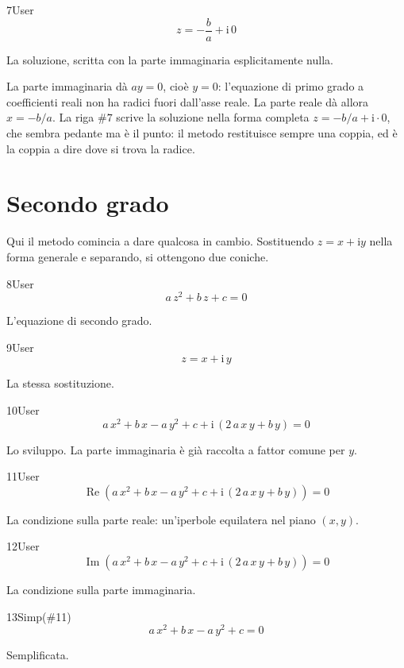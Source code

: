 \begin{espr}{7}{User}{}
\[
z = -\frac{b}{a} + \mathrm{i}\, 0
\]
\end{espr}
La soluzione, scritta con la parte immaginaria esplicitamente nulla.


La parte immaginaria dà $ay=0$, cioè $y=0$: l'equazione di primo grado a coefficienti reali non ha radici fuori dall'asse reale. La parte reale dà allora $x=-b/a$. La riga $\#7$ scrive la soluzione nella forma completa $z=-b/a+\mathrm{i}\cdot0$, che sembra pedante ma è il punto: il metodo restituisce sempre una coppia, ed è la coppia a dire dove si trova la radice.

\section{Secondo grado}

Qui il metodo comincia a dare qualcosa in cambio. Sostituendo $z=x+\mathrm{i}y$ nella forma generale e separando, si ottengono due coniche.

\begin{espr}{8}{User}{}
\[
a\, z^{2} + b\, z + c = 0
\]
\end{espr}
L'equazione di secondo grado.

\begin{espr}{9}{User}{}
\[
z = x + \mathrm{i}\, y
\]
\end{espr}
La stessa sostituzione.

\begin{espr}{10}{User}{}
\[
a\, x^{2} + b\, x - a\, y^{2} + c + \mathrm{i}\, \left(2\, a\, x\, y + b\, y\right) = 0
\]
\end{espr}
Lo sviluppo. La parte immaginaria è già raccolta a fattor comune per $y$.

\begin{espr}{11}{User}{}
\[
\operatorname{Re}\!\left(a\, x^{2} + b\, x - a\, y^{2} + c + \mathrm{i}\, \left(2\, a\, x\, y + b\, y\right)\right) = 0
\]
\end{espr}
La condizione sulla parte reale: un'iperbole equilatera nel piano $(x,y)$.

\begin{espr}{12}{User}{}
\[
\operatorname{Im}\!\left(a\, x^{2} + b\, x - a\, y^{2} + c + \mathrm{i}\, \left(2\, a\, x\, y + b\, y\right)\right) = 0
\]
\end{espr}
La condizione sulla parte immaginaria.

\begin{espr}{13}{Simp(\#11)}{}
\[
a\, x^{2} + b\, x - a\, y^{2} + c = 0
\]
\end{espr}
Semplificata.

